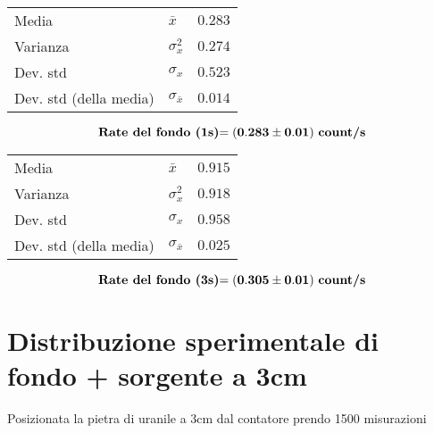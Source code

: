 \documentclass{article}
\begin{document}
\begin{minipage}[c]{0.45\textwidth}
\vspace{1cm}
\begin{center}
\hspace{0.5cm}
\begin{tabular}{llr}
	Media                       & $\bar{x}$             & $0.283$       \\		
	Varianza                    & $\sigma_{x}^2$          & $0.274$     \\
	Dev. std                    & $\sigma_{x}$              & $0.523$   \\
	Dev. std (della media)      & $\sigma_{\bar{x}}$    & $0.014$       \\
\end{tabular}
\end{center}

\[ 
	\text{\textbf{Rate del fondo (1s)}} \mathbf{ = \left(0.283 \pm 0.01\right)}\text{ \textbf{count/s}}
\]
\end{minipage}
\hfill
\begin{minipage}[c]{0.45\textwidth}
\vspace{1cm}
\begin{center}
\begin{tabular}{llr}
	Media                       & $\bar{x}$             & $0.915$       \\		
	Varianza                    & $\sigma_{x}^2$          & $0.918$     \\
	Dev. std                    & $\sigma_{x}$              & $0.958$   \\
	Dev. std (della media)      & $\sigma_{\bar{x}}$    & $0.025$       \\
\end{tabular}
\end{center}

\[ 
	\text{\textbf{Rate del fondo (3s)}}  \mathbf{ = \left(0.305 \pm 0.01 \right)} \text{ \textbf{count/s}}
\]
\end{minipage}




\section{Distribuzione sperimentale di fondo + sorgente a 3cm}
Posizionata la pietra di uranile a 3cm dal contatore prendo 1500 misurazioni 
\end{document}
